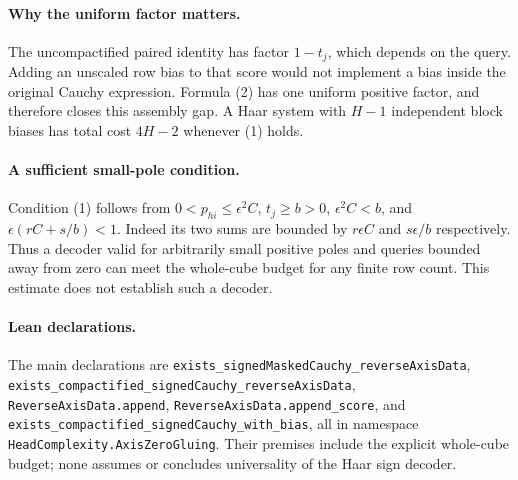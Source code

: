 \documentclass[11pt]{article}
\begin{document}
\paragraph{Why the uniform factor matters.}
The uncompactified paired identity has factor $1-t_j$, which depends
on the query. Adding an unscaled row bias to that score would not
implement a bias inside the original Cauchy expression. Formula (2)
has one uniform positive factor, and therefore closes this assembly
gap. A Haar system with $H-1$ independent block biases has total cost
$4H-2$ whenever (1) holds.

\paragraph{A sufficient small-pole condition.}
Condition (1) follows from $0<p_{hi}\leq\epsilon^2C$, $t_j\geq b>0$,
$\epsilon^2C<b$, and $\epsilon(rC+s/b)<1$. Indeed its two sums are
bounded by $r\epsilon C$ and $s\epsilon/b$ respectively. Thus a decoder
valid for arbitrarily small positive poles and queries bounded away
from zero can meet the whole-cube budget for any finite row count.
This estimate does not establish such a decoder.

\paragraph{Lean declarations.}
The main declarations are
\texttt{exists\_signedMaskedCauchy\_reverseAxisData},
\texttt{exists\_compactified\_signedCauchy\_reverseAxisData},
\texttt{ReverseAxisData.append},
\texttt{ReverseAxisData.append\_score}, and
\texttt{exists\_compactified\_signedCauchy\_with\_bias},
all in namespace \texttt{HeadComplexity.AxisZeroGluing}.
Their premises include the explicit whole-cube budget; none assumes
or concludes universality of the Haar sign decoder.
\end{document}
